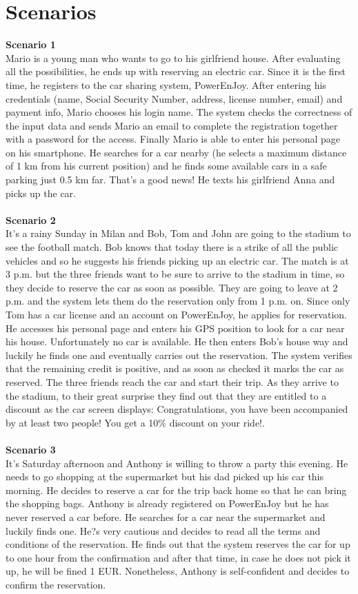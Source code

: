 \documentclass[11pt,a4paper]{report}
\begin{document}
\chapter{Scenarios}
\textbf{Scenario 1}\\
Mario is a young man who wants to go to his girlfriend house. After evaluating all the possibilities, he ends up with reserving an electric car. Since it is the first time, he registers to the car sharing system, PowerEnJoy. After entering his credentials (name, Social Security Number, address, license number, email) and payment info, Mario chooses his login name. The system checks the correctness of the input data and sends Mario an email to complete the registration together with a password for the access. 
Finally Mario is able to enter his personal page on his smartphone. He searches for a car nearby (he selects a maximum distance of 1 km from his current position) and he finds some available cars in a safe parking just 0.5 km far. That's a good news! He texts his girlfriend Anna and picks up the car.\\ 
\noindent \\
\textbf{Scenario 2}\\
It's a rainy Sunday in Milan and Bob, Tom and John are going to the stadium to see the football match. Bob knows that today there is a strike of all the public vehicles and so he suggests his friends picking up an electric car. The match is at 3 p.m. but the three friends want to be sure to arrive to the stadium in time, so they decide to reserve the car as soon as possible. They are going to leave at 2 p.m. and the system lets them do the reservation only from 1 p.m. on. Since only Tom has a car license and an account on PowerEnJoy, he applies for reservation. He accesses his personal page and enters his GPS position to look for a car near his house. Unfortunately no car is available. He then enters Bob's house way and luckily he finds one and eventually carries out the reservation. The system verifies that the remaining credit is positive, and as soon as checked it marks the car as reserved. 
The three friends reach the car and start their trip. As they arrive to the stadium, to their great surprise they find out that they are entitled to a discount as the car screen displays: Congratulations, you have been accompanied by at least two people! You get a 10\% discount on your ride!. \\ 
\noindent \\
\textbf{Scenario 3}\\
It's Saturday afternoon and Anthony is willing to throw a party this evening. He needs to go shopping at the supermarket but his dad picked up his car this morning. He decides to reserve a car for the trip back home so that he can bring the shopping bags. Anthony is already registered on PowerEnJoy but he has never reserved a car before. He searches for a car near the supermarket and luckily finds one. He?s very cautious and decides to read all the terms and conditions of the reservation. He finds out that the system reserves the car for up to one hour from the confirmation and after that time, in case he does not pick it up, he will be fined 1 EUR. Nonetheless, Anthony is self-confident and decides to confirm the reservation.
\end{document}
